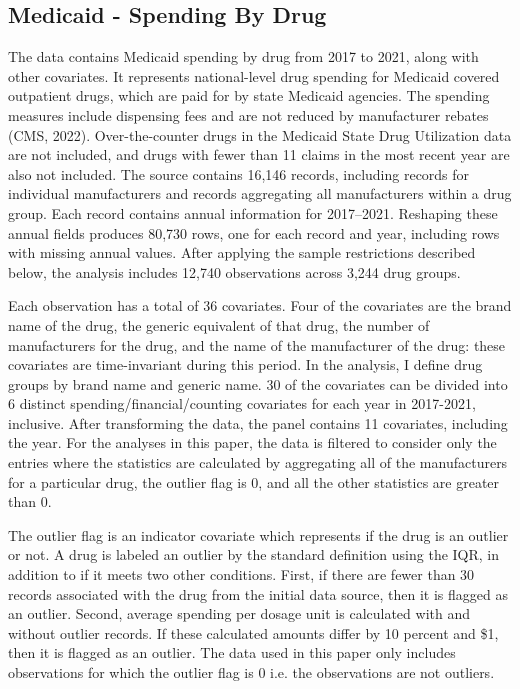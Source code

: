 \subsection{Medicaid - Spending By Drug}
The data contains Medicaid spending by drug from 2017 to 2021, along with other covariates. It represents national-level drug spending for Medicaid covered outpatient drugs, which are paid for by state Medicaid agencies. The spending measures include dispensing fees and are not reduced by manufacturer rebates (CMS, 2022). Over-the-counter drugs in the Medicaid State Drug Utilization data are not included, and drugs with fewer than 11 claims in the most recent year are also not included. The source contains 16,146 records, including records for individual manufacturers and records aggregating all manufacturers within a drug group. Each record contains annual information for 2017--2021. Reshaping these annual fields produces 80,730 rows, one for each record and year, including rows with missing annual values. After applying the sample restrictions described below, the analysis includes 12,740 observations across 3,244 drug groups.

Each observation has a total of 36 covariates.
Four of the covariates are the brand name of the drug, the generic equivalent of that drug, the number of manufacturers for the drug, and the name of the manufacturer of the drug: these covariates are time-invariant during this period. In the analysis, I define drug groups by brand name and generic name. 30 of the covariates can be divided into 6 distinct spending/financial/counting covariates for each year in 2017-2021, inclusive. After transforming the data, the panel contains 11 covariates, including the year. For the analyses in this paper, the data is filtered to consider only the entries where the statistics are calculated by aggregating all of the manufacturers for a particular drug, the outlier flag is 0, and all the other statistics are greater than 0.

The outlier flag is an indicator covariate which represents if the drug is an outlier or not. A drug is labeled an outlier by the standard definition using the IQR, in addition to if it meets two other conditions. First, if there are fewer than 30 records associated with the drug from the initial data source, then it is flagged as an outlier. Second, average spending per dosage unit is calculated with and without outlier records. If these calculated amounts differ by 10 percent and \$1, then it is flagged as an outlier. The data used in this paper only includes observations for which the outlier flag is 0 i.e. the observations are not outliers.

